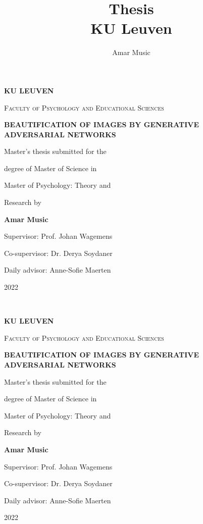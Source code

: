 \documentclass[12pt, a4paper]{article}
\title{
	{Thesis}\\
	{\large KU Leuven}
}
\author{Amar Music}
\begin{document}
	\begin{titlepage}
		\centering
		\vspace{2cm}
		{\huge\bfseries KU LEUVEN\par}
		\vspace{1cm}
		{\huge\scshape Faculty of Psychology and Educational Sciences\par}
		\vspace{4cm}
		{\Large\bfseries BEAUTIFICATION OF IMAGES BY GENERATIVE ADVERSARIAL NETWORKS\par}
		\vspace{4.5cm}
		\begin{flushright}
			\large Master's thesis submitted for the \par degree of Master of Science in \par Master of Psychology: Theory and \par Research by \par
			{\large\bfseries Amar Music \par}
			\vspace{1cm}
			{\large Supervisor: Prof. Johan Wagemens\par}
			{\large Co-supervisor: Dr. Derya Soydaner\par}
			{\large Daily advisor: Anne-Sofie Maerten\par}
		\end{flushright}
		\vfill
		{\large 2022\par}
	\end{titlepage}

	\newpage {} \  \newpage
	
	\begin{titlepage}
		\centering
		\vspace{2cm}
		{\huge\bfseries KU LEUVEN\par}
		\vspace{1cm}
		{\huge\scshape Faculty of Psychology and Educational Sciences\par}
		\vspace{4cm}
		{\Large\bfseries BEAUTIFICATION OF IMAGES BY GENERATIVE ADVERSARIAL NETWORKS\par}
		\vspace{4.5cm}
		\begin{flushright}
			\large Master's thesis submitted for the \par degree of Master of Science in \par Master of Psychology: Theory and \par Research by \par
			{\large\bfseries Amar Music \par}
			\vspace{1cm}
			{\large Supervisor: Prof. Johan Wagemens\par}
			{\large Co-supervisor: Dr. Derya Soydaner\par}
			{\large Daily advisor: Anne-Sofie Maerten\par}
		\end{flushright}
		\vfill
		{\large 2022\par}
	\end{titlepage}
\end{document}

